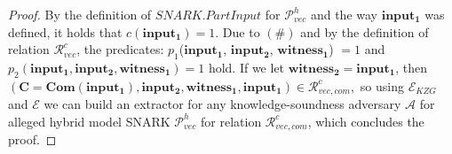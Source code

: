 \begin{proof}
\noindent By the definition of $\mathit{SNARK.PartInput}$ for $\mathscr{P}_{\mathit{vec}}^{h}$ and the way $\mathbf{input_1}$ was defined, 
it holds that $c(\mathbf{input_1}) = 1$. Due to $(\#)$ and by the definition of relation $\mathcal{R}_{\mathit{vec}}^{c}$, 
the predicates: $p_1$($\mathbf{input_1}$, $\mathbf{input_2}$, $\mathbf{witness_1}$) $= 1$ and 
$p_2(\mathbf{input_1}, \mathbf{input_2}, \mathbf{witness_1}) = 1$ hold. If we let 
$\mathbf{witness_2} = \mathbf{input_1}$, then 
$(\mathbf{C} = \mathbf{Com}(\mathbf{input_1}), \mathbf{input_2}, \mathbf{witness_1}, \mathbf{input_1}) \in \mathcal{R}_{\mathit{vec}, \mathit{com}}^c,$ so 
using $\mathcal{E}_{\mathit{KZG}}$ and $\mathcal{E}$ we can build an extractor for any knowledge-soundness adversary $\mathcal{A}$ for alleged 
hybrid model SNARK $\mathscr{P}_{\mathit{vec}}^{h}$ for relation $\mathcal{R}_{\mathit{vec}, \mathit{com}}^c$, which concludes the proof.
\end{proof}